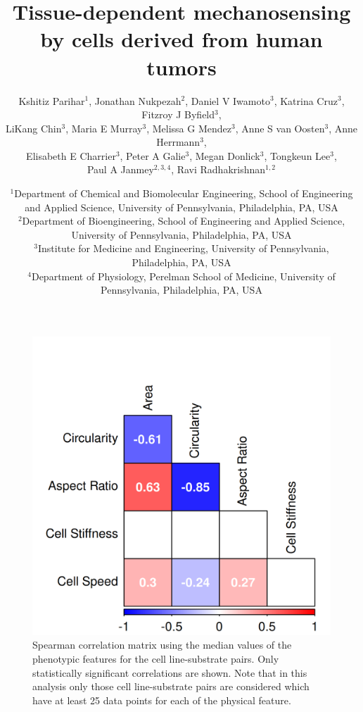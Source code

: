 \documentclass[11pt,letterpaper,english,oneside]{article} %
\author{Kshitiz Parihar$^1$, 
Jonathan Nukpezah$^2$, 
Daniel V Iwamoto$^3$, 
Katrina Cruz$^3$, 
Fitzroy J Byfield$^3$, \\
LiKang Chin$^3$, 
Maria E Murray$^3$, 
Melissa G Mendez$^3$, 
Anne S van Oosten$^3$, 
Anne Herrmann$^3$, \\
Elisabeth E Charrier$^3$, 
Peter A Galie$^3$, 
Megan Donlick$^3$, 
Tongkeun Lee$^3$, \\
Paul A Janmey$^{2,3,4}$, 
Ravi Radhakrishnan$^{1,2}$
}
\title{Tissue-dependent mechanosensing by cells derived from human tumors}
\date{%
    $^1$Department of Chemical and Biomolecular Engineering, School of Engineering and Applied Science, University of Pennsylvania, Philadelphia, PA, USA \\
    $^2$Department of Bioengineering, School of Engineering and Applied Science, University of Pennsylvania, Philadelphia, PA, USA \\
    $^3$Institute for Medicine and Engineering, University of Pennsylvania, Philadelphia, PA, USA \\
    $^4$Department of Physiology, Perelman School of Medicine, University of Pennsylvania, Philadelphia, PA, USA \\
}
\begin{document}
\renewcommand{\figurename}{Supplementary Figure}
\renewcommand{\tablename}{Supplementary Table}

\maketitle







\clearpage
\begin{figure}
    \centering
    \includegraphics[scale=0.8]{../Figures/supplementary_figure1.png}
    \caption{Spearman correlation matrix using the median values of the phenotypic features for the cell line-substrate pairs. Only statistically significant correlations are shown.
    Note that in this analysis only those cell line-substrate pairs are considered which have at least 25 data points for each of the physical feature.}
    \label{fig:fig1}
\end{figure}
\end{document}
